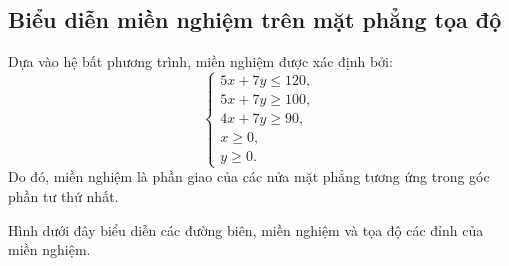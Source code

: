 \documentclass[12pt,a4paper]{article}
\begin{document}
\subsection{Biểu diễn miền nghiệm trên mặt phẳng tọa độ}

Dựa vào hệ bất phương trình, miền nghiệm được xác định bởi:
\[
\begin{cases}
5x+7y\leq120,\\
5x+7y\geq100,\\
4x+7y\geq90,\\
x\geq0,\\
y\geq0.
\end{cases}
\]
Do đó, miền nghiệm là phần giao của các nửa mặt phẳng tương ứng trong góc phần tư thứ nhất.

Hình dưới đây biểu diễn các đường biên, miền nghiệm và tọa độ các đỉnh của miền nghiệm.
\end{document}

